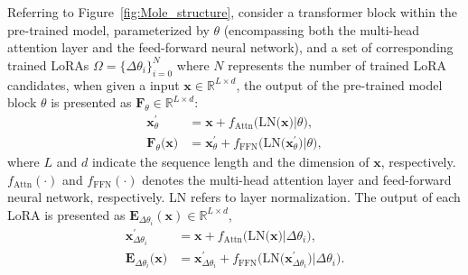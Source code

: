 Referring to Figure~\ref{fig:Mole_structure}, consider a transformer block within the pre-trained model, parameterized by $\theta$ (encompassing both the multi-head attention layer and the feed-forward neural network), and a set of corresponding trained LoRAs $\Omega = \{\Delta\theta_i\}^{N}_{i=0}$ where $N$ represents the number of trained LoRA candidates, when given a input $\boldsymbol{x} \in \mathbb{R}^{L\times d}$, the output of the pre-trained model block $\theta$ is presented as $\boldsymbol{F}_{\theta} \in \mathbb{R}^{L\times d}$:
\begin{align}
\boldsymbol{x}^{'}_{\theta} &= \boldsymbol{x} + f_{\text{Attn}}\Big(\text{LN}\big(\boldsymbol{x}\big)\big|\theta\Big), \\
\boldsymbol{F}_{\theta}\big(\boldsymbol{x}\big) &= \boldsymbol{x}^{'}_{\theta} + f_{\text{FFN}}\Big(\text{LN}\big(\boldsymbol{x}^{'}_{\theta}\big)\big|\theta\Big),
\end{align}
where $L$ and $d$ indicate the sequence length and the dimension of $\boldsymbol{x}$, respectively. $f_{\text{Attn}}\left(\cdot\right)$ and $f_{\text{FFN}}\left(\cdot\right)$ denotes the multi-head attention layer and feed-forward neural network, respectively. LN refers to layer normalization.
The output of each LoRA is presented as $\boldsymbol{E}_{\Delta\theta_i}\left(\boldsymbol{x}\right) \in \mathbb{R}^{L\times d}$,
\begin{align}
\boldsymbol{x}^{'}_{\Delta\theta_i} &= \boldsymbol{x} + f_{\text{Attn}}\Big(\text{LN}\big(\boldsymbol{x}\big)\big|\Delta\theta_i\Big), \\
\boldsymbol{E}_{\Delta\theta_i}\big(\boldsymbol{x}\big) &= \boldsymbol{x}^{'}_{\Delta\theta_i} + f_{\text{FFN}}\Big(\text{LN}\big(\boldsymbol{x}^{'}_{\Delta\theta_i}\big)\big|\Delta\theta_i\Big).
\end{align}

